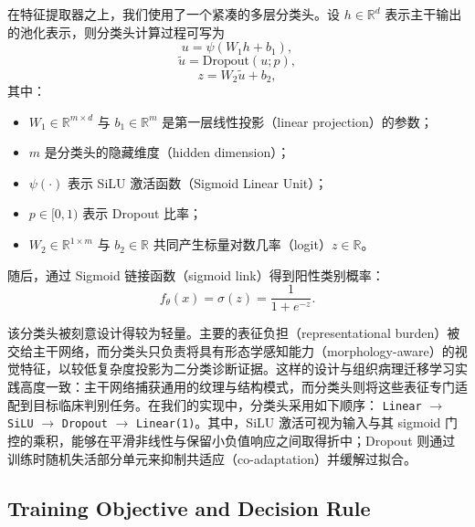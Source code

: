在特征提取器之上，我们使用了一个紧凑的多层分类头。设 $h \in \mathbb{R}^{d}$ 表示主干输出的池化表示，则分类头计算过程可写为
\begin{equation}
    u = \psi\left(W_{1} h + b_{1}\right),
\end{equation}
\begin{equation}
    \tilde{u} = \mathrm{Dropout}(u; p),
\end{equation}
\begin{equation}
    z = W_{2} \tilde{u} + b_{2},
\end{equation}
其中：
\begin{itemize}
    \item $W_{1} \in \mathbb{R}^{m \times d}$ 与 $b_{1} \in \mathbb{R}^{m}$ 是第一层线性投影（linear projection）的参数；
    \item $m$ 是分类头的隐藏维度（hidden dimension）；
    \item $\psi(\cdot)$ 表示 SiLU 激活函数（Sigmoid Linear Unit）；
    \item $p \in [0,1)$ 表示 Dropout 比率；
    \item $W_{2} \in \mathbb{R}^{1 \times m}$ 与 $b_{2} \in \mathbb{R}$ 共同产生标量对数几率（logit）$z \in \mathbb{R}$。
\end{itemize}

随后，通过 Sigmoid 链接函数（sigmoid link）得到阳性类别概率：
\begin{equation}
    f_{\theta}(x) = \sigma(z) = \frac{1}{1 + e^{-z}}.
\end{equation}

该分类头被刻意设计得较为轻量。主要的表征负担（representational burden）被交给主干网络，而分类头只负责将具有形态学感知能力（morphology-aware）的视觉特征，以较低复杂度投影为二分类诊断证据。这样的设计与组织病理迁移学习实践高度一致：主干网络捕获通用的纹理与结构模式，而分类头则将这些表征专门适配到目标临床判别任务。在我们的实现中，分类头采用如下顺序：
\texttt{Linear} $\rightarrow$ \texttt{SiLU} $\rightarrow$ \texttt{Dropout} $\rightarrow$ \texttt{Linear(1)}。其中，SiLU 激活可视为输入与其 sigmoid 门控的乘积，能够在平滑非线性与保留小负值响应之间取得折中\cite{Elfwing2018SiLU}；Dropout 则通过训练时随机失活部分单元来抑制共适应（co-adaptation）并缓解过拟合\cite{Srivastava2014Dropout}。

\subsection{Training Objective and Decision Rule}
\label{subsec:training_objective}


